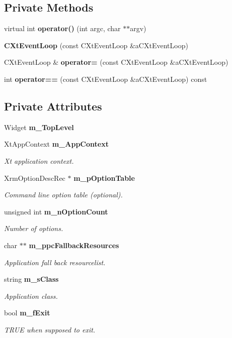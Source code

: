 \subsection*{Private Methods}
\begin{CompactItemize}
\item 
virtual int {\bf operator()} (int argc, char $\ast$$\ast$argv)
\item 
{\bf CXt\-Event\-Loop} (const CXt\-Event\-Loop \&a\-CXt\-Event\-Loop)
\item 
CXt\-Event\-Loop \& {\bf operator=} (const CXt\-Event\-Loop \&a\-CXt\-Event\-Loop)
\item 
int {\bf operator==} (const CXt\-Event\-Loop \&a\-CXt\-Event\-Loop) const
\end{CompactItemize}
\subsection*{Private Attributes}
\begin{CompactItemize}
\item 
Widget {\bf m\_\-Top\-Level}
\item 
Xt\-App\-Context {\bf m\_\-App\-Context}
\begin{CompactList}\small\item\em Xt application context.\item\end{CompactList}\item 
Xrm\-Option\-Desc\-Rec $\ast$ {\bf m\_\-p\-Option\-Table}
\begin{CompactList}\small\item\em Command line option table (optional).\item\end{CompactList}\item 
unsigned int {\bf m\_\-n\-Option\-Count}
\begin{CompactList}\small\item\em Number of options.\item\end{CompactList}\item 
char $\ast$$\ast$ {\bf m\_\-ppc\-Fallback\-Resources}
\begin{CompactList}\small\item\em Application fall back resourcelist.\item\end{CompactList}\item 
string {\bf m\_\-s\-Class}
\begin{CompactList}\small\item\em Application class.\item\end{CompactList}\item 
bool {\bf m\_\-f\-Exit}
\begin{CompactList}\small\item\em TRUE when supposed to exit.\item\end{CompactList}\end{CompactItemize}


